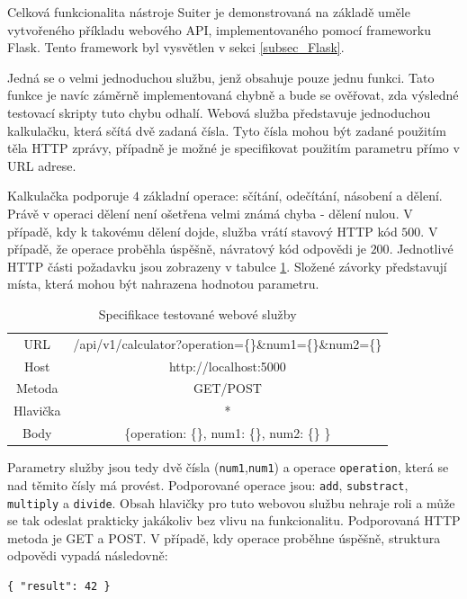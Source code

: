 Celková funkcionalita nástroje Suiter je demonstrovaná na základě uměle vytvořeného příkladu webového API, implementovaného pomocí frameworku Flask. Tento framework byl vysvětlen v sekci \ref{subsec_Flask}.  

Jedná se o velmi jednoduchou službu, jenž obsahuje pouze jednu funkci. Tato funkce je navíc záměrně implementovaná chybně a bude se ověřovat, zda výsledné testovací skripty tuto chybu odhalí. Webová služba představuje jednoduchou kalkulačku, která sčítá dvě zadaná čísla. Tyto čísla mohou být zadané použitím těla HTTP zprávy, případně je možné je specifikovat použitím parametru přímo v URL adrese. 

Kalkulačka podporuje $4$ základní operace: sčítání, odečítání, násobení a dělení. Právě v operaci dělení není ošetřena velmi známá chyba - dělení nulou. V případě, kdy k takovému dělení dojde, služba vrátí stavový HTTP kód $500$. V případě, že operace proběhla úspěšně, návratový kód odpovědi je $200$. Jednotlivé HTTP části požadavku jsou zobrazeny v tabulce \ref{table_SpecifikaceSluzby}. Složené závorky představují místa, která mohou být nahrazena hodnotou parametru.

\begin{table}[h]
\centering
\begin{tabular}{ |c|c| } 
 \hline
URL & /api/v1/calculator?operation=\{\}\&num1=\{\}\&num2=\{\} \\
Host & http://localhost:5000 \\
Metoda & GET/POST \\ 
Hlavička & * \\ 
Body & \{operation: \{\}, num1: \{\}, num2: \{\} \} \\ 
 \hline
\end{tabular}
\caption{Specifikace testované webové služby}
\label{table_SpecifikaceSluzby}
\end{table}

Parametry služby jsou tedy dvě čísla (\texttt{num1},\texttt{num1}) a operace \texttt{operation}, která se nad těmito čísly má provést. Podporované operace jsou: \texttt{add}, \texttt{substract}, \texttt{multiply} a \texttt{divide}. Obsah hlavičky pro tuto webovou službu nehraje roli a může se tak odeslat prakticky jakákoliv bez vlivu na funkcionalitu. Podporovaná HTTP metoda je GET a POST. V případě, kdy operace proběhne úspěšně, struktura odpovědi vypadá následovně: 
\begin{lstlisting}[language={json2}, frame=single]
{ "result": 42 }
\end{lstlisting}

